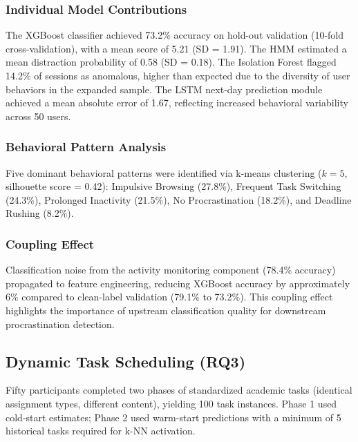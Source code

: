 \documentclass[conference]{IEEEtran}
\begin{document}
\subsubsection{Individual Model Contributions}
The XGBoost classifier achieved 73.2\% accuracy on hold-out validation (10-fold cross-validation), with a mean score of 5.21 (SD = 1.91). The HMM estimated a mean distraction probability of 0.58 (SD = 0.18). The Isolation Forest flagged 14.2\% of sessions as anomalous, higher than expected due to the diversity of user behaviors in the expanded sample. The LSTM next-day prediction module achieved a mean absolute error of 1.67, reflecting increased behavioral variability across 50 users.

\subsubsection{Behavioral Pattern Analysis}
Five dominant behavioral patterns were identified via k-means clustering ($k = 5$, silhouette score = 0.42): Impulsive Browsing (27.8\%), Frequent Task Switching (24.3\%), Prolonged Inactivity (21.5\%), No Procrastination (18.2\%), and Deadline Rushing (8.2\%).

\subsubsection{Coupling Effect}
Classification noise from the activity monitoring component (78.4\% accuracy) propagated to feature engineering, reducing XGBoost accuracy by approximately 6\% compared to clean-label validation (79.1\% to 73.2\%). This coupling effect highlights the importance of upstream classification quality for downstream procrastination detection.

\subsection{Dynamic Task Scheduling (RQ3)}

Fifty participants completed two phases of standardized academic tasks (identical assignment types, different content), yielding 100 task instances. Phase 1 used cold-start estimates; Phase 2 used warm-start predictions with a minimum of 5 historical tasks required for k-NN activation.
\end{document}
